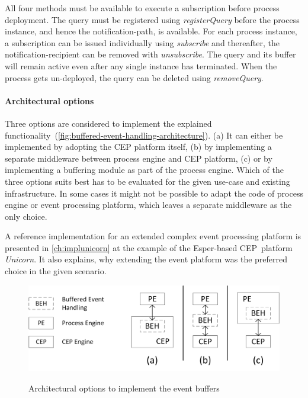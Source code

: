 \noindent
All four methods must be available to execute a subscription before process deployment.
The query must be registered using \textit{registerQuery} before the process instance, and hence the notification-path, is available. For each process instance, a subscription can be issued individually using \textit{subscribe} and thereafter, the notification-recipient can be removed with \textit{unsubscribe}.
The query and its buffer will remain active even after any single instance has terminated. When the process gets un-deployed, the query can be deleted using \textit{removeQuery}.


\paragraph{Architectural options}

Three options are considered to implement the explained functionality~(\autoref{fig:buffered-event-handling-architecture}). 
(a) It can either be implemented by adopting the CEP platform itself, (b) by implementing a separate middleware between process engine and CEP platform, (c) or by implementing a buffering module as part of the process engine.
Which of the three options suits best has to be evaluated for the given use-case and existing infrastructure. In some cases it might not be possible to adapt the code of process engine or event processing platform, which leaves a separate middleware as the only choice.

A reference implementation for an extended complex event processing platform is presented in \autoref{ch:implunicorn} at the example of the Esper-based CEP~platform \textit{Unicorn}. It also explains, why extending the event platform was the preferred choice in the given scenario.

\begin{figure}[]
	\myfloatalign
	{\includegraphics[width=0.8\linewidth]{chapters/concept/automaticsubscription/architecture-options.png}}
	\caption{Architectural options to implement the event buffers}
	\label{fig:buffered-event-handling-architecture}
\end{figure}


